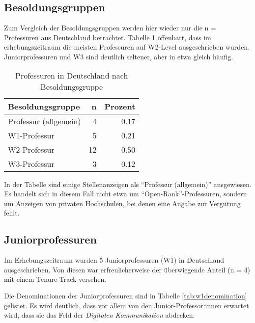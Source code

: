 \documentclass[
]{article}
\begin{document}
\hypertarget{besoldungsgruppen}{%
\subsection{Besoldungsgruppen}\label{besoldungsgruppen}}

Zum Vergleich der Besoldungsgruppen werden hier wieder nur die n = Professuren aus Deutschland betrachtet. Tabelle \ref{tab:profpay} offenbart, dass im erhebungszeitraum die meisten Professuren auf W2-Level ausgeschrieben wurden. Juniorprofessuren und W3 sind deutlich seltener, aber in etwa gleich häufig.

\begin{table}[H]

\caption{\label{tab:profpay}Professuren in Deutschland nach Besoldungsgruppe}
\centering
\begin{tabular}[t]{l|r|r}
\hline
Besoldungsgruppe & n & Prozent\\
\hline
Professur (allgemein) & 4 & 0.17\\
\hline
W1-Professur & 5 & 0.21\\
\hline
W2-Professur & 12 & 0.50\\
\hline
W3-Professur & 3 & 0.12\\
\hline
\end{tabular}
\end{table}

In der Tabelle sind einige Stellenanzeigen als ``Professur (allgemein)'' ausgewiesen. Es handelt sich in diesem Fall nicht etwa um ``Open-Rank''-Professuren, sondern um Anzeigen von privaten Hochschulen, bei denen eine Angabe zur Vergütung fehlt.

\hypertarget{juniorprofessuren}{%
\subsection{Juniorprofessuren}\label{juniorprofessuren}}

Im Erhebungszeitraum wurden 5 Juniorprofessuren (W1) in Deutschland ausgeschrieben. Von diesen war erfreulicherweise der überwiegende Anteil (n = 4) mit einem Tenure-Track versehen.

Die Denominationen der Juniorprofessuren sind in Tabelle \ref{tab:w1denomination} gelistet. Es wird deutlich, dass vor allem von den Junior-Professor:innen erwartet wird, dass sie das Feld der \emph{Digitalen Kommunikation} abdecken.
\end{document}
